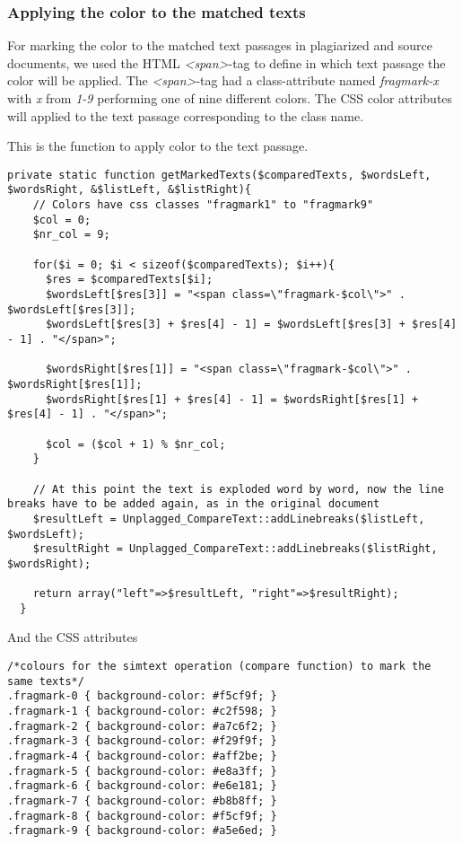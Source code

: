 \subsubsection{Applying the color to the matched texts}

For marking the color to the matched text passages in plagiarized and source documents, we used the HTML \textit{<span>}-tag to define in which text passage the color will be applied. The \textit{<span>}-tag had a class-attribute named \textit{fragmark-x} with \textit{x} from \textit{1-9} performing one of nine different colors. The CSS color attributes will applied to the text passage corresponding to the class name.

This is the function to apply color to the text passage.

\begin{lstlisting}
private static function getMarkedTexts($comparedTexts, $wordsLeft, $wordsRight, &$listLeft, &$listRight){
    // Colors have css classes "fragmark1" to "fragmark9"
    $col = 0;
    $nr_col = 9;
    
    for($i = 0; $i < sizeof($comparedTexts); $i++){
      $res = $comparedTexts[$i];
      $wordsLeft[$res[3]] = "<span class=\"fragmark-$col\">" . $wordsLeft[$res[3]];
      $wordsLeft[$res[3] + $res[4] - 1] = $wordsLeft[$res[3] + $res[4] - 1] . "</span>";

      $wordsRight[$res[1]] = "<span class=\"fragmark-$col\">" . $wordsRight[$res[1]];
      $wordsRight[$res[1] + $res[4] - 1] = $wordsRight[$res[1] + $res[4] - 1] . "</span>";

      $col = ($col + 1) % $nr_col;
    }
    
    // At this point the text is exploded word by word, now the line breaks have to be added again, as in the original document
    $resultLeft = Unplagged_CompareText::addLinebreaks($listLeft, $wordsLeft);
    $resultRight = Unplagged_CompareText::addLinebreaks($listRight, $wordsRight);

    return array("left"=>$resultLeft, "right"=>$resultRight);
  }
\end{lstlisting}

And the CSS attributes

\begin{lstlisting}
/*colours for the simtext operation (compare function) to mark the same texts*/
.fragmark-0 { background-color: #f5cf9f; }
.fragmark-1 { background-color: #c2f598; }
.fragmark-2 { background-color: #a7c6f2; }
.fragmark-3 { background-color: #f29f9f; }
.fragmark-4 { background-color: #aff2be; }
.fragmark-5 { background-color: #e8a3ff; }
.fragmark-6 { background-color: #e6e181; }
.fragmark-7 { background-color: #b8b8ff; }
.fragmark-8 { background-color: #f5cf9f; }
.fragmark-9 { background-color: #a5e6ed; }
\end{lstlisting}